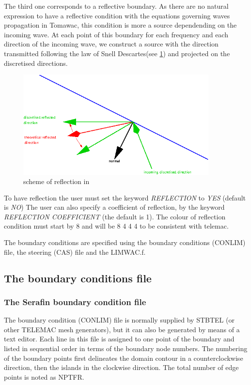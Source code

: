  The third one corresponds to a reflective boundary. As there are no natural expression to have a reflective condition with the
 equations governing waves propagation in Tomawac, this condition is more a source dependending on the incoming wave. At each point of
 this boundary for each frequency and each direction of the incoming wave, we construct a source with the direction transmitted
 following the law of Snell Descartes(see \ref{fig:reflection}) and projected on the discretised directions.

\begin{figure}[H]%
\begin{center}
\includegraphics[width=0.9\textwidth]{graphics/reflection}
\caption{scheme of reflection in \tomawac}
\label{fig:reflection}
\end{center}
\end{figure}

To have reflection the user must set the keyword \textit{REFLECTION} to \textit{YES} (default is \textit{NO})
The user can also specify a coefficient of reflection, by the keyword \textit{REFLECTION COEFFICIENT} (the default is 1).
The colour of reflection condition must start by 8 and will be 8 4 4 4 to be consistent with telemac.

 The boundary conditions are specified using the boundary conditions (CONLIM) file, the steering (CAS) file and the LIMWAC.f.


 \subsection{ The boundary conditions file}

 \subsubsection{The Serafin boundary condition file}
\label{se:BCfile}
The boundary condition (CONLIM) file is normally supplied by STBTEL (or other TELEMAC mesh generators), but it can also be generated
by means of a text editor. Each line in this file is assigned to one point of the boundary and listed in sequential order in terms of
the boundary node numbers. The numbering of the boundary points first delineates the domain contour in a counterclockwise direction,
then the islands in the
clockwise direction. The total number of edge points is noted as NPTFR.

